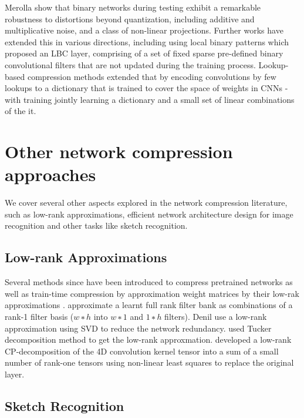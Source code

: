 \noindent Merolla \etal \cite{merolla2016deep} show that binary networks during testing exhibit a remarkable robustness to distortions beyond quantization, including additive and multiplicative noise, and a class of non-linear projections. Further works have extended this in various directions, including using local binary patterns \cite{juefei2016local} which proposed an LBC layer, comprising of a set of fixed sparse pre-defined binary convolutional filters that are not updated during the training process. Lookup-based compression methods \cite{bagherinezhad2016lcnn} extended that by encoding convolutions by few lookups to a dictionary that is trained to cover the space of weights in CNNs - with training jointly learning a dictionary and a small set of linear combinations of the it.

\section{Other network compression approaches}

\noindent We cover several other aspects explored in the network compression literature, such as low-rank approximations, efficient network architecture design for image recognition and other tasks like sketch recognition. 

\subsection{Low-rank Approximations} 

\noindent Several methods since \cite{sainath2013low} have been introduced to compress pretrained networks as well as train-time compression by approximation weight matrices by their low-rak approximations \cite{novikov2015tensorizing, masana2017domain}. \cite{jaderberg2014speeding} approximate a learnt full rank filter bank as combinations of a rank-1 filter basis ($w∗h$ into $w∗1$ and $1∗h$ filters). Denil \etal \cite{denil2013predicting} use a low-rank approximation using SVD to reduce the network redundancy.  \cite{kim2015compression} used Tucker decomposition method to get the low-rank approxmation. \cite{lebedev2014speeding} developed a low-rank CP-decomposition of the 4D convolution kernel tensor into a sum of a small number of rank-one tensors using non-linear least squares to replace the original layer.

\subsection{Sketch Recognition}

